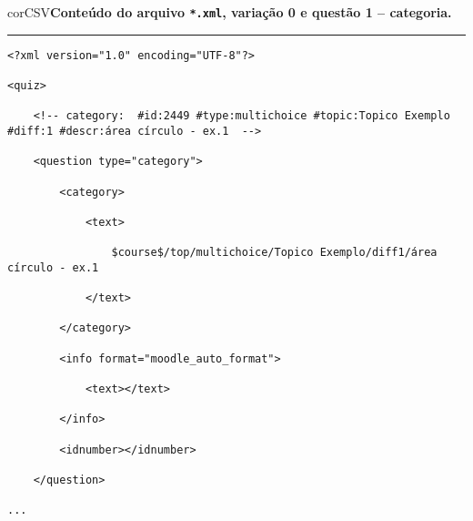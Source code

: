 
\begin{myboxCode}{corCSV}{\textbf{Conteúdo do arquivo \texttt{*.xml}, variação 0 e questão 1 -- categoria.}}\vspace{3mm}
\hrule
{\scriptsize
\begin{verbatim}
<?xml version="1.0" encoding="UTF-8"?>

<quiz>

    <!-- category:  #id:2449 #type:multichoice #topic:Topico Exemplo #diff:1 #descr:área círculo - ex.1  -->
    
    <question type="category">
    
        <category>
        
            <text>
            
                $course$/top/multichoice/Topico Exemplo/diff1/área círculo - ex.1
            
            </text>
            
        </category>
        
        <info format="moodle_auto_format">
        
            <text></text>
            
        </info>
        
        <idnumber></idnumber>
        
    </question>
    
...
\end{verbatim}
}
\end{myboxCode}

